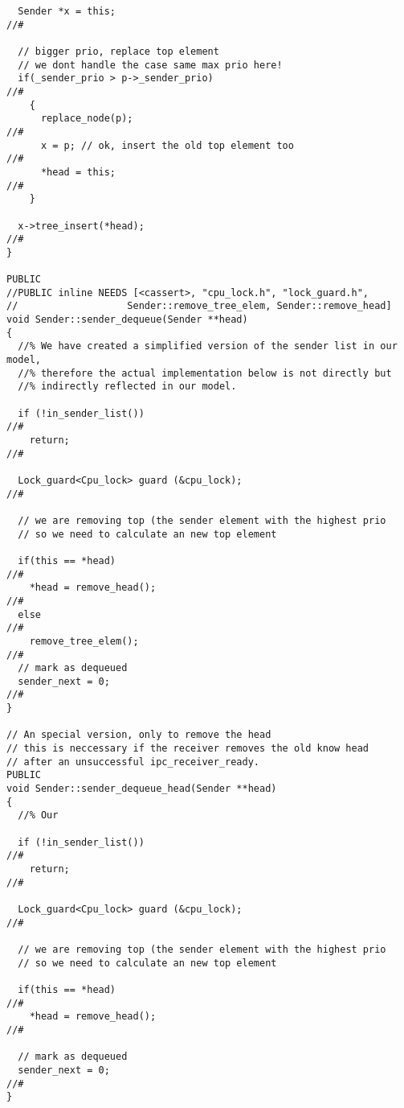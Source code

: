 \begin{lstlisting}
  Sender *x = this;                                                        //#

  // bigger prio, replace top element
  // we dont handle the case same max prio here!
  if(_sender_prio > p->_sender_prio)                                       //#
    {
      replace_node(p);                                                     //#
      x = p; // ok, insert the old top element too                         //#
      *head = this;                                                        //#
    }

  x->tree_insert(*head);                                                   //#
}

PUBLIC
//PUBLIC inline NEEDS [<cassert>, "cpu_lock.h", "lock_guard.h",
//                   Sender::remove_tree_elem, Sender::remove_head]
void Sender::sender_dequeue(Sender **head)
{
  //% We have created a simplified version of the sender list in our model,
  //% therefore the actual implementation below is not directly but 
  //% indirectly reflected in our model.

  if (!in_sender_list())                                                   //#
    return;                                                                //#

  Lock_guard<Cpu_lock> guard (&cpu_lock);                                  //#

  // we are removing top (the sender element with the highest prio
  // so we need to calculate an new top element

  if(this == *head)                                                        //#
    *head = remove_head();                                                 //#
  else                                                                     //#
    remove_tree_elem();                                                    //#
  // mark as dequeued
  sender_next = 0;                                                         //#
}

// An special version, only to remove the head
// this is neccessary if the receiver removes the old know head
// after an unsuccessful ipc_receiver_ready.
PUBLIC
void Sender::sender_dequeue_head(Sender **head)
{
  //% Our 

  if (!in_sender_list())                                                   //#
    return;                                                                //#

  Lock_guard<Cpu_lock> guard (&cpu_lock);                                  //#

  // we are removing top (the sender element with the highest prio
  // so we need to calculate an new top element

  if(this == *head)                                                        //#
    *head = remove_head();                                                 //#

  // mark as dequeued
  sender_next = 0;                                                         //#
}
\end{lstlisting}